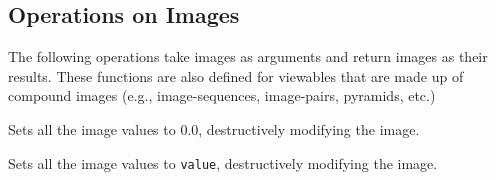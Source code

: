 \subsection{Operations on Images}

The following operations take images as arguments and return images as
their results.  These functions are also defined for viewables that
are made up of compound images (e.g., image-sequences, image-pairs,
pyramids, etc.)

\begin{description}

\item{}
Sets all the image values to 0.0, destructively modifying the image.

\item{}
Sets all the image values to {\tt value}, destructively modifying the
image.
\end{description}


